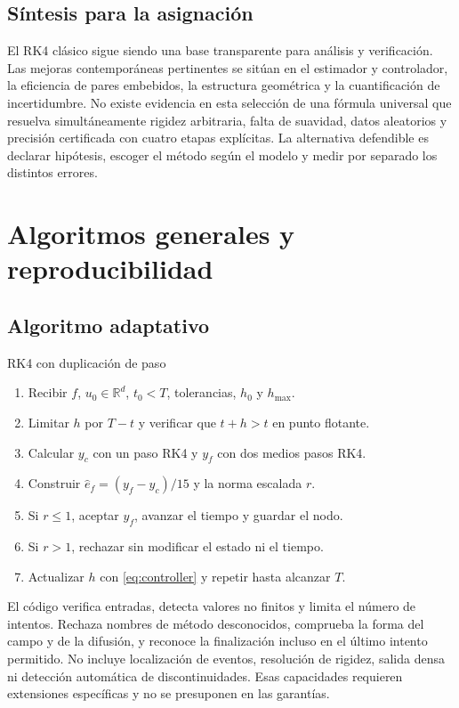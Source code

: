 \documentclass[11pt,a4paper]{article}
\theoremstyle{definition}\newtheorem{definition}[theorem]{Definición}
\theoremstyle{remark}\newtheorem{remark}[theorem]{Observación}
\newcommand{\R}{\mathbb R}\newcommand{\E}{\mathbb E}
\begin{document}
\subsection{Síntesis para la asignación}
El RK4 clásico sigue siendo una base transparente para análisis y
verificación. Las mejoras contemporáneas pertinentes se sitúan en el
estimador y controlador, la eficiencia de pares embebidos, la estructura
geométrica y la cuantificación de incertidumbre. No existe evidencia en
esta selección de una fórmula universal que resuelva simultáneamente
rigidez arbitraria, falta de suavidad, datos aleatorios y precisión
certificada con cuatro etapas explícitas. La alternativa defendible es
declarar hipótesis, escoger el método según el modelo y medir por separado
los distintos errores.

\clearpage
\section{Algoritmos generales y reproducibilidad}
\subsection{Algoritmo adaptativo}
\begin{keybox}{RK4 con duplicación de paso}
\begin{enumerate}
\item Recibir $f$, $u_0\in\R^d$, $t_0<T$, tolerancias, $h_0$ y $h_{\max}$.
\item Limitar $h$ por $T-t$ y verificar que $t+h>t$ en punto flotante.
\item Calcular $y_c$ con un paso RK4 y $y_f$ con dos medios pasos RK4.
\item Construir $\widehat e_f=(y_f-y_c)/15$ y la norma escalada $r$.
\item Si $r\leq1$, aceptar $y_f$, avanzar el tiempo y guardar el nodo.
\item Si $r>1$, rechazar sin modificar el estado ni el tiempo.
\item Actualizar $h$ con \eqref{eq:controller} y repetir hasta alcanzar $T$.
\end{enumerate}
\end{keybox}
El código verifica entradas, detecta valores no finitos y limita el número
de intentos. Rechaza nombres de método desconocidos, comprueba la forma del
campo y de la difusión, y reconoce la finalización incluso en el último
intento permitido. No incluye localización de eventos, resolución de rigidez,
salida densa ni detección automática de discontinuidades. Esas capacidades
requieren extensiones específicas y no se presuponen en las garantías.
\end{document}
